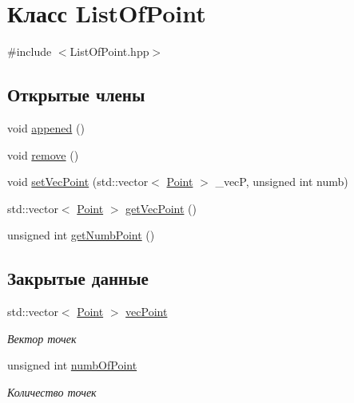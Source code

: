 \hypertarget{class_list_of_point}{}\section{Класс List\+Of\+Point}
\label{class_list_of_point}


{\ttfamily \#include $<$List\+Of\+Point.\+hpp$>$}

\subsection*{Открытые члены}
\begin{DoxyCompactItemize}
\item 
void \hyperlink{class_list_of_point_a0363f1ed11e5fb29a3c3be29d780ef94}{appened} ()
\item 
void \hyperlink{class_list_of_point_a43b5c6f717d6f51db060d6a864f7c3df}{remove} ()
\item 
void \hyperlink{class_list_of_point_afb2225e127fdeef1395f50d13940c382}{set\+Vec\+Point} (std\+::vector$<$ \hyperlink{class_point}{Point} $>$ \+\_\+vecP, unsigned int numb)
\item 
std\+::vector$<$ \hyperlink{class_point}{Point} $>$ \hyperlink{class_list_of_point_af8e3e5bd134cd03d146f9a480402ef8e}{get\+Vec\+Point} ()
\item 
unsigned int \hyperlink{class_list_of_point_a1b181a4d62551af12ec94da3162213f6}{get\+Numb\+Point} ()
\end{DoxyCompactItemize}
\subsection*{Закрытые данные}
\begin{DoxyCompactItemize}
\item 
std\+::vector$<$ \hyperlink{class_point}{Point} $>$ \hyperlink{class_list_of_point_a546103de5b7156b63dc985255bd55583}{vec\+Point}
\begin{DoxyCompactList}\small\item\em Вектор точек \end{DoxyCompactList}\item 
unsigned int \hyperlink{class_list_of_point_aad3a2ed059297484a75ec74b0a45f78c}{numb\+Of\+Point}
\begin{DoxyCompactList}\small\item\em Количество точек \end{DoxyCompactList}\end{DoxyCompactItemize}


